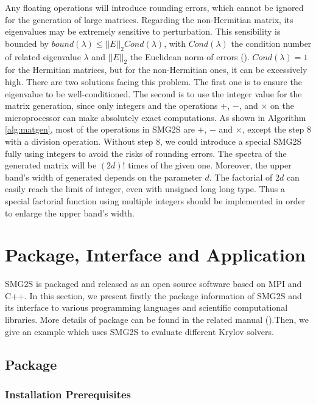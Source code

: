 Any floating operations will introduce rounding errors, which cannot be ignored for the generation of large matrices. Regarding the non-Hermitian matrix, its eigenvalues may be extremely sensitive to perturbation. This sensibility is bounded by $bound(\lambda) \leq ||E||_2Cond(\lambda)$, with $Cond(\lambda)$ the condition number of related eigenvalue $\lambda$ and $||E||_2$ the Euclidean norm of errors (\cite{saad2011numerical}). $Cond(\lambda)=1$ for the Hermitian matrices, but for the non-Hermitian ones, it can be excessively high. There are two solutions facing this problem. The first one is to ensure the eigenvalue to be well-conditioned. The second is to use the integer value for the matrix generation, since only integers and the operations $+$, $-$, and $\times$ on the microprocessor can make absolutely exact computations. As shown in Algorithm \ref{alg:matgen}, most of the operations in SMG2S are $+$, $-$ and $\times$, except the step 8 with a division operation. Without step 8, we could introduce a special SMG2S fully using integers to avoid the risks of rounding errors. The spectra of the generated matrix will be $(2d)!$ times of the given one. Moreover, the upper band's width of generated depends on the parameter $d$. The factorial of $2d$ can easily reach the limit of integer, even with unsigned long long type. Thus a special factorial function using multiple integers should be implemented in order to enlarge the upper band's width.

\section{Package, Interface and Application}

SMG2S is packaged and released as an open source software based on MPI and C++. In this section, we present firstly the package information of SMG2S and its interface to various programming languages and scientific computational libraries. More details of package can be found in the related manual (\cite{wu2018smg2s}).Then, we give an example which uses SMG2S to evaluate different Krylov solvers. 

\subsection{Package}

\subsubsection{Installation Prerequisites}

